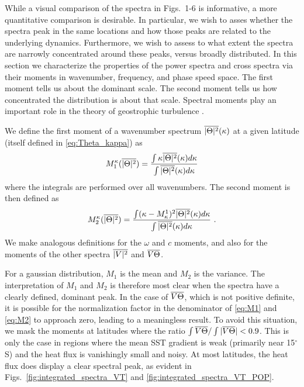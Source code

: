 \documentclass[10pt]{article}
\newcommand{\ol}{\ensuremath{\overline}}
\begin{document}
While a visual comparison of the spectra in Figs.~1-6 is informative, a more quantitative comparison is desirable. In particular, we wish to asses whether the spectra peak in the same locations and how those peaks are related to the underlying dynamics. Furthermore, we wish to assess to what extent the spectra are narrowly concentrated around these peaks, versus broadly distributed. In this section we characterize the properties of the power spectra and cross spectra via their moments in wavenumber, frequency, and phase speed space. The first moment tells us about the dominant scale. The second moment tells us how concentrated the distribution is about that scale. Spectral moments play an important role in the theory of geostrophic turbulence \citep[e.g.][]{Rhines1975}.

We define the first moment of a wavenumber spectrum $\ol{|\Theta|^2}(\kappa)$ at a given latitude (itself defined in \ref{eq:Theta_kappa}) as
\begin{equation}
M^\kappa_1 ( \ol{|\Theta|^2} ) = \frac{ \int \kappa \ol{|\Theta|^2}(\kappa) d \kappa }{ \int \ol{|\Theta|^2}(\kappa) d \kappa }
\label{eq:M1}
\end{equation}
where the integrals are performed over all wavenumbers. The second moment is then defined as
\begin{equation}
M^\kappa_2 (\ol{ |\Theta|^2 }) = \frac{ \int (\kappa - M^1_\kappa)^2 \ol{|\Theta|^2}(\kappa) d \kappa }{ \int \ol{|\Theta|^2}(\kappa) d \kappa } \ .
\label{eq:M2}
\end{equation}
We make analogous definitions for the $\omega$ and $c$ moments, and also for the moments of the other spectra $\ol{|V|^2}$ and $\ol{V \Theta}$. 

For a gaussian distribution, $M_1$ is the mean and $M_2$ is the variance. The interpretation of $M_1$ and $M_2$ is therefore most clear when the spectra have a clearly defined, dominant peak. In the case of $\ol{V \Theta}$,  which is not positive definite, it is possible for the normalization factor in the denominator of \eqref{eq:M1} and \eqref{eq:M2} to approach zero, leading to a meaningless result. To avoid this situation, we mask the moments at latitudes where the ratio $\int \ol{V\Theta} / \int | \ol{V \Theta} | < 0.9$. This is only the case in regions where the mean SST gradient is weak (primarily near 15$^\circ$S) and the heat flux is vanishingly small and noisy. At most latitudes, the heat flux does display a clear spectral peak, as evident in Figs.~\ref{fig:integrated_spectra_VT} and \ref{fig:integrated_spectra_VT_POP}.
\end{document}
